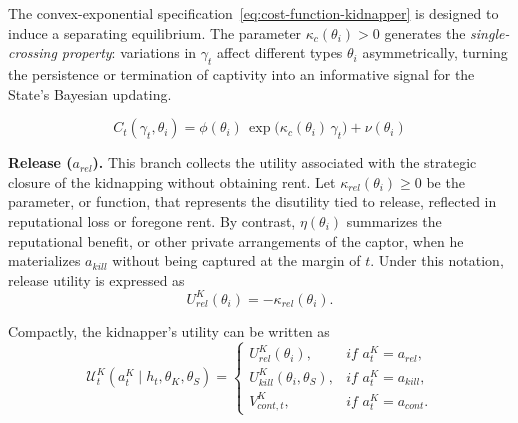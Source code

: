 \documentclass[12pt,a4paper]{article}
\theoremstyle{plain}
\theoremstyle{definition}
\theoremstyle{remark}
\newcommand{\1}{\mathbf{1}}
\begin{document}
The convex-exponential specification~\eqref{eq:cost-function-kidnapper} is designed to induce a separating equilibrium. The parameter $\kappa_c(\theta_i)>0$ generates the \textit{single-crossing property}: variations in $\gamma_t$ affect different types $\theta_i$ asymmetrically, turning the persistence or termination of captivity into an informative signal for the State's Bayesian updating.

\begin{equation}
  \label{eq:cost-function-kidnapper}
  C_t(\gamma_t, \theta_i) = \phi(\theta_i)\,\exp\bigl( \kappa_c(\theta_i)\,\gamma_t \bigr) + \nu(\theta_i)
\end{equation}

\textbf{Release ($a_{rel}$).} This branch collects the utility associated with the strategic closure of the kidnapping without obtaining rent. Let $\kappa_{rel}(\theta_i)\ge 0$ be the parameter, or function, that represents the disutility tied to release, reflected in reputational loss or foregone rent. By contrast, $\eta(\theta_i)$ summarizes the reputational benefit, or other private arrangements of the captor, when he materializes $a_{kill}$ without being captured at the margin of $t$. Under this notation, release utility is expressed as
\[
U^K_{rel}(\theta_i) = -\kappa_{rel}(\theta_i).
\]

\noindent Compactly, the kidnapper's utility can be written as
\begin{equation}
\label{eq:kidnapper-utility-general}
\mathcal{U}^K_t(a_t^K \mid h_t,\theta_K,\theta_S)
=
\begin{cases}
U^K_{rel}(\theta_i), & \textit{if } a_t^K = a_{rel},\\
U^K_{kill}(\theta_i,\theta_S), & \textit{if } a_t^K = a_{kill},\\
V^K_{cont,t}, & \textit{if } a_t^K = a_{cont}.
\end{cases}
\end{equation}
\end{document}
